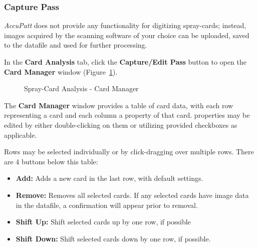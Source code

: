 \documentclass[10pt,letterpaper,titlepage]{article}
\begin{document}
    \subsubsection{Capture Pass}
    \textit{AccuPatt} does not provide any functionality for digitizing spray-cards; instead, images acquired by the scanning software of your choice can be uploaded, saved to the datafile and used for further processing.\par
    In the \textbf{Card Analysis} tab, click the \textbf{Capture/Edit Pass} button to open the \textbf{Card Manager} window (Figure~\ref{fig:card_manager}).\par 
    \begin{figure}[h]
        \centering
        \caption{Spray-Card Analysis - Card Manager}
        \label{fig:card_manager}
    \end{figure}
    The \textbf{Card Manager} window provides a table of card data, with each row representing a card and each column a property of that card. properties may be edited by either double-clicking on them or utilizing provided checkboxes as applicable.\par
    Rows may be selected individually or by click-dragging over multiple rows. There are 4 buttons below this table:
    \begin{itemize}
        \item \textbf{Add:} Adds a new card in the last row, with default settings.
        \item \textbf{Remove:} Removes all selected cards. If any selected cards have image data in the datafile, a confirmation will appear prior to removal.
        \item \textbf{Shift Up:} Shift selected cards up by one row, if possible
        \item \textbf{Shift Down:} Shift selected cards down by one row, if possible.
    \end{itemize}
\end{document}
